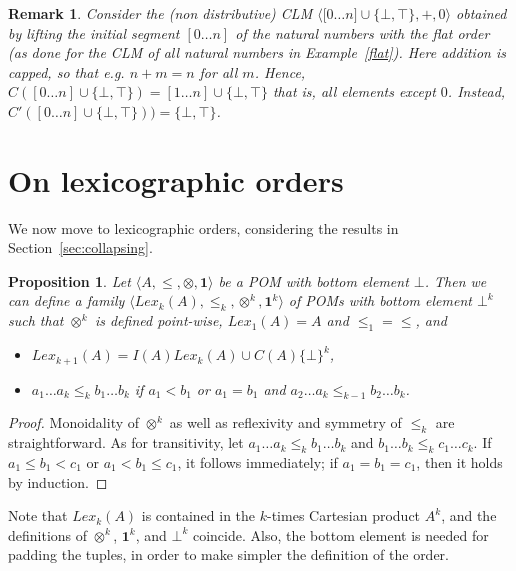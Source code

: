 \documentclass[a4paper]{elsarticle}
\newtheorem{remark}{Remark}
\newtheorem{proposition}{Proposition}
\newcommand{\monop}{\otimes}
\newcommand{\1}{\mathbf{1}}
\begin{document}
\begin{remark}
	Consider the (non distributive) CLM $\langle \mathbb [0 \ldots n] \cup \{\bot,\top\}, +, 0 \rangle$ 
	obtained by lifting the initial segment $[0 \ldots n]$ of the natural numbers with the flat order (as done for
	the CLM of all natural numbers in Example~\ref{flat}). Here addition is capped, so that 
	e.g. $n + m = n$ for all $m$. Hence, $C([0 \ldots n] \cup \{\bot,\top\}) = [1 \ldots n] \cup \{\bot,\top\}$
	that is, all elements except $0$. Instead, $C'([0 \ldots n] \cup \{\bot,\top\})) =  \{\bot,\top\}$.
\end{remark}

\section{On lexicographic orders}\label{sec:lexico}
We now move to lexicographic orders, considering the results in Section~\ref{sec:collapsing}.

\begin{proposition}\label{def:lexilist}
	Let $\langle A, \leq, \monop, \1 \rangle$ be a POM with bottom element $\bot$.
	Then we can define a family $\langle Lex_k(A), \leq_k, \monop^k, \1^k \rangle$ 
	of POMs with bottom element $\bot^k$ such that $\monop^k$ is defined point-wise, 
	$Lex_1(A) = A$ and $\leq_1 = \leq$, and
	
	\begin{itemize}
		\item $Lex_{k+1}(A) = I(A) Lex_k(A) \cup C(A) \{\bot\}^k$,
		\item $a_1 \ldots a_k \leq_k b_1 \ldots b_k$ if $a_1 < b_1$ or $a_1 = b_1$ 
		and  $a_2 \ldots a_k \leq_{k-1} b_2 \ldots b_k$.
	\end{itemize}
\end{proposition}

\begin{proof}
	Monoidality of $\monop^k$ as well as reflexivity and symmetry of $\leq_k$ are straightforward.
	As for transitivity, let $a_1 \ldots a_k \leq_k b_1 \ldots b_k$ and $b_1 \ldots b_k \leq_k c_1 \ldots c_k$.
	If $a_1 \leq b_1 < c_1$ or $a_1 < b_1 \leq c_1$, it follows immediately; if $a_1 = b_1 = c_1$, then it
	holds by induction.
\end{proof}

Note that $Lex_k(A)$ is contained in the $k$-times Cartesian product $A^k$, 
and the definitions of $\monop^k$, $\1^k$, and $\bot^k$ coincide.
%
Also, the bottom element is needed for padding the tuples, in order to make
simpler the definition of the order.
\end{document}
